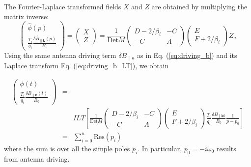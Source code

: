 \documentclass[12pt]{article}
\begin{document}
The Fourier-Laplace transformed fields $X$ and $Z$ are obtained by multiplying the matrix inverse:
%
\begin{equation}
\begin{pmatrix}
\hat{\phi} (p)\\
\frac{T_i}{q_i} \frac{\delta \hat{B}_{\parallel \mathbf{k}}(p)}{B_0} 
\end{pmatrix}
=
\begin{pmatrix}
X \\
Z
\end{pmatrix}
=\frac{1}{\mathrm{Det}M}
\begin{pmatrix}
D-2/\beta_i  & -C\\
-C & A
\end{pmatrix}
\begin{pmatrix}
E \\
F + 2/\beta_i
\end{pmatrix}
Z_a
\end{equation}
Using the same antenna driving term $\delta B_{\parallel a}$ as in Eq. (\ref{eq:driving_b}) and its Laplace transform Eq. (\ref{eq:driving_b_LT}), we obtain

\begin{eqnarray}
\begin{pmatrix}
\phi (t)\\
\frac{T_i}{q_i} \frac{\delta B_{\parallel \mathbf{k}}(t)}{B_0} 
\end{pmatrix}
&= &\nonumber \\
 & & ILT\left[
\frac{1}{\mathrm{Det}M}
\begin{pmatrix}
D-2/\beta_i  & -C\\
-C & A
\end{pmatrix}
\begin{pmatrix}
E \\
F + 2/\beta_i
\end{pmatrix}
 \frac{T_i}{q_i} \frac{\delta B_{\parallel \mathbf{k}0}}{B_0}
 \frac{1}{p-p_0}
\right] \nonumber \\
&=&\sum_{i=0}^n \mathrm{Res}(p_i)
\end{eqnarray}
where the sum is over all the simple poles $p_i$. In particular, $p_0 = -i\omega_0$ results from antenna driving. 
\end{document}

